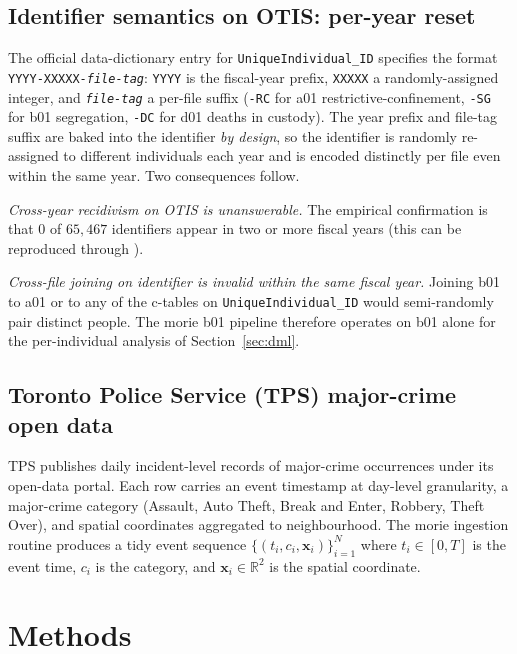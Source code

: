 \documentclass[article,shortnames,nojss]{jss}
\newcommand{\OTIS}{\textsf{OTIS}}
\newcommand{\TPS}{\textsf{TPS}}
\begin{document}
\subsection[Identifier semantics on OTIS: per-year reset]{Identifier semantics on \OTIS{}: per-year reset}
\label{sec:data-otis-id}

The official data-dictionary entry for
\texttt{UniqueIndividual\_ID} specifies the format
\texttt{YYYY-XXXXX-{\textit{file-tag}}}: \texttt{YYYY} is the
fiscal-year prefix, \texttt{XXXXX} a randomly-assigned integer,
and \texttt{\textit{file-tag}} a per-file suffix
(\texttt{-RC} for a01 restrictive-confinement, \texttt{-SG} for
b01 segregation, \texttt{-DC} for d01 deaths in custody).  The
year prefix and file-tag suffix are baked into the identifier
\emph{by design}, so the identifier is randomly re-assigned to
different individuals each year and is encoded distinctly per
file even within the same year. Two consequences follow.

\emph{Cross-year recidivism on \OTIS{} is unanswerable.} The
empirical confirmation is that $0$ of $65{,}467$ identifiers appear
in two or more fiscal years (this can be reproduced through
).

\emph{Cross-file joining on identifier is invalid within the same
fiscal year.} Joining b01 to a01 or to any of the c-tables on
\texttt{UniqueIndividual\_ID} would semi-randomly pair distinct
people. The morie b01 pipeline therefore operates on b01 alone for
the per-individual analysis of Section~\ref{sec:dml}.

\subsection[Toronto Police Service (TPS) major-crime open data]{Toronto Police Service (\TPS{}) major-crime open data}
\label{sec:data-tps}

\TPS{} publishes daily incident-level records of major-crime
occurrences under its open-data portal. Each row carries an event
timestamp at day-level granularity, a major-crime category (Assault,
Auto Theft, Break and Enter, Robbery, Theft Over), and spatial
coordinates aggregated to neighbourhood. The morie ingestion routine
 produces a tidy event sequence
$\{(t_i, c_i, \mathbf{x}_i)\}_{i=1}^{N}$ where $t_i \in [0, T]$ is
the event time, $c_i$ is the category, and $\mathbf{x}_i \in
\mathbb{R}^2$ is the spatial coordinate.

\section{Methods}
\label{sec:methods}
\end{document}
